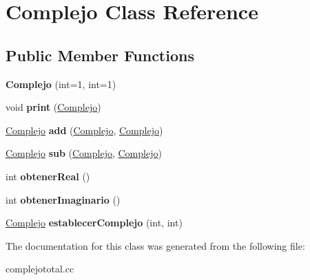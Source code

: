 \hypertarget{classComplejo}{}\section{Complejo Class Reference}
\label{classComplejo}
\subsection*{Public Member Functions}
\begin{DoxyCompactItemize}
\item 
\mbox{\label{classComplejo_aa6e6f01b6e221b103d95a294637221aa}} 
{\bfseries Complejo} (int=1, int=1)
\item 
\mbox{\label{classComplejo_a27c5233834947ad03c36ae41ed08fba2}} 
void {\bfseries print} (\hyperlink{classComplejo}{Complejo})
\item 
\mbox{\label{classComplejo_a8a5cf7fef1e17f5f69687d7d86c5630f}} 
\hyperlink{classComplejo}{Complejo} {\bfseries add} (\hyperlink{classComplejo}{Complejo}, \hyperlink{classComplejo}{Complejo})
\item 
\mbox{\label{classComplejo_a9909333b60268b4cae530aff5466a85d}} 
\hyperlink{classComplejo}{Complejo} {\bfseries sub} (\hyperlink{classComplejo}{Complejo}, \hyperlink{classComplejo}{Complejo})
\item 
\mbox{\label{classComplejo_a106084370e38c62ac948650806b84117}} 
int {\bfseries obtener\+Real} ()
\item 
\mbox{\label{classComplejo_a010ac0b17b97d0fed2dafdc3f52f0ed5}} 
int {\bfseries obtener\+Imaginario} ()
\item 
\mbox{\label{classComplejo_a07e8642abb134c73726616c6a1fa25b3}} 
\hyperlink{classComplejo}{Complejo} {\bfseries establecer\+Complejo} (int, int)
\end{DoxyCompactItemize}


The documentation for this class was generated from the following file\+:\begin{DoxyCompactItemize}
\item 
complejototal.\+cc\end{DoxyCompactItemize}

